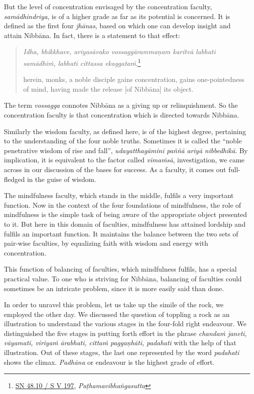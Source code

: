 But the level of concentration envisaged by the concentration faculty, \emph{samādhindriya}, is of a higher grade as far as its potential is concerned. It is defined as the first four \emph{jhānas}, based on which one can develop insight and attain Nibbāna. In fact, there is a statement to that effect:

\begin{quote}
\emph{Idha, bhikkhave, ariyasāvako vossaggārammaṇam karitvā labhati samādhiṁ, labhati cittassa ekaggataṁ},\footnote{\href{https://suttacentral.net/sn48.10/pli/ms}{SN 48.10 / S V 197}, \emph{Paṭhamavibhaṅgasutta}}

herein, monks, a noble disciple gains concentration, gains one-pointedness of mind, having made the release {[}of Nibbāna{]} its object.
\end{quote}

The term \emph{vossagga} connotes Nibbāna as a giving up or relinquishment. So the concentration faculty is that concentration which is directed towards Nibbāna.

Similarly the wisdom faculty, as defined here, is of the highest degree, pertaining to the understanding of the four noble truths. Sometimes it is called the ``noble penetrative wisdom of rise and fall'', \emph{udayatthagāminī paññā ariyā nibbedhikā}. By implication, it is equivalent to the factor called \emph{vīmaṁsā}, investigation, we came across in our discussion of the bases for success. As a faculty, it comes out full-fledged in the guise of wisdom.

The mindfulness faculty, which stands in the middle, fulfils a very important function. Now in the context of the four foundations of mindfulness, the role of mindfulness is the simple task of being aware of the appropriate object presented to it. But here in this domain of faculties, mindfulness has attained lordship and fulfils an important function. It maintains the balance between the two sets of pair-wise faculties, by equalizing faith with wisdom and energy with concentration.

This function of balancing of faculties, which mindfulness fulfils, has a special practical value. To one who is striving for Nibbāna, balancing of faculties could sometimes be an intricate problem, since it is more easily said than done.

In order to unravel this problem, let us take up the simile of the rock, we employed the other day. We discussed the question of toppling a rock as an illustration to understand the various stages in the four-fold right endeavour. We distinguished the five stages in putting forth effort in the phrase \emph{chandaṁ janeti, vāyamati, viriyaṁ ārabhati, cittaṁ paggaṇhāti, padahati} with the help of that illustration. Out of these stages, the last one represented by the word \emph{padahati} shows the climax. \emph{Padhāna} or endeavour is the highest grade of effort.

